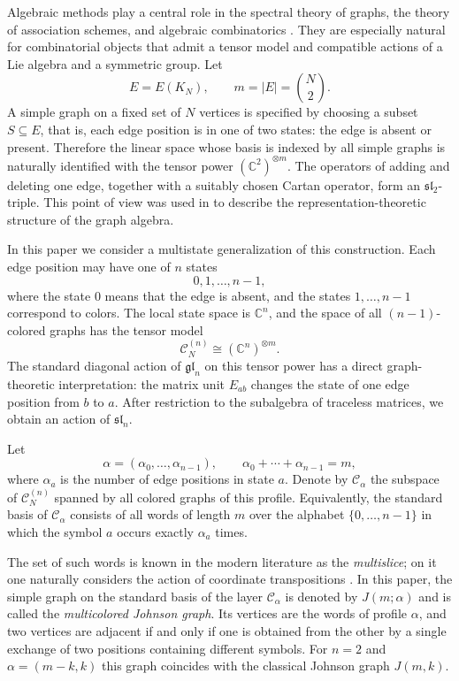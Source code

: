 \documentclass[12pt,reqno]{amsart}
\begin{document}
Algebraic methods play a central role in the spectral theory of graphs,
the theory of association schemes, and algebraic combinatorics
\cite{Delsarte1973,BannaiIto1984,BrouwerCohenNeumaier1989}. They are
especially natural for combinatorial objects that admit a tensor model and
compatible actions of a Lie algebra and a symmetric group.
Let
$$
E=E(K_N),
\qquad
m=|E|=\binom N2.
$$
A simple graph on a fixed set of $N$ vertices is specified by choosing a
subset $S\subseteq E$, that is, each edge position is in one of two
states: the edge is absent or present. Therefore the linear space whose
basis is indexed by all simple graphs is naturally identified with the
tensor power
$
(\mathbb C^2)^{\otimes m}.
$
The operators of adding and deleting one edge, together with a suitably
chosen Cartan operator, form an $\mathfrak{sl}_2$-triple. This point of
view was used in
\cite{BedratyukGraphAlgebraI} to describe the representation-theoretic
structure of the graph algebra.

In this paper we consider a multistate generalization of this construction.
Each edge position may have one of $n$ states
$$
0,1,\dots,n-1,
$$
where the state $0$ means that the edge is absent, and the states
$1,\dots,n-1$ correspond to colors. The local state space is
$\mathbb C^n$, and the space of all $(n-1)$-colored graphs has the tensor
model
$$
\mathcal C_N^{(n)}
\cong
(\mathbb C^n)^{\otimes m}.
$$
The standard diagonal action of $\mathfrak{gl}_n$ on this tensor power has
a direct graph-theoretic interpretation: the matrix unit $E_{ab}$ changes
the state of one edge position from $b$ to $a$. After restriction to the
subalgebra of traceless matrices, we obtain an action of $\mathfrak{sl}_n$.

Let
$$
\alpha=(\alpha_0,\dots,\alpha_{n-1}),
\qquad
\alpha_0+\cdots+\alpha_{n-1}=m,
$$
where $\alpha_a$ is the number of edge positions in state $a$. Denote by
$\mathcal C_\alpha$ the subspace of $\mathcal C_N^{(n)}$ spanned by all
colored graphs of this profile. Equivalently, the standard basis of
$\mathcal C_\alpha$ consists of all words of length $m$ over the alphabet
$\{0,\dots,n-1\}$ in which the symbol $a$ occurs exactly $\alpha_a$ times.

The set of such words is known in the modern literature as the
\emph{multislice}; on it one naturally considers the action of coordinate
transpositions \cite{Chase1973,Ruskey1988,FilmusODonnellWu2022}. In this
paper, the simple graph on the standard basis of the layer
$\mathcal C_\alpha$ is denoted by $J(m;\alpha)$ and is called the
\emph{multicolored Johnson graph}. Its vertices are the words of profile
$\alpha$, and two vertices are adjacent if and only if one is obtained
from the other by a single exchange of two positions containing different
symbols. For $n=2$ and
$
\alpha=(m-k,k)
$
this graph coincides with the classical Johnson graph $J(m,k)$.
\end{document}
